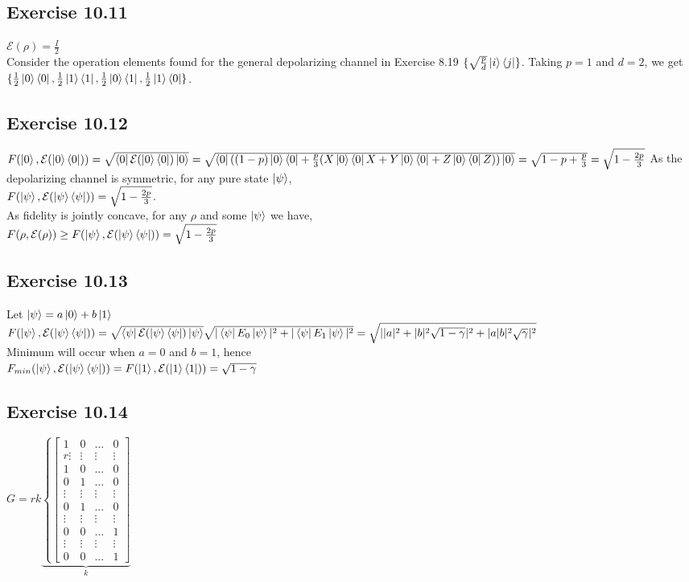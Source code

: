\documentclass[a4paper,12pt]{article}
\begin{document}
\subsection*{Exercise 10.11}
$\mathcal{E}(\rho)=\frac{I}{2}$\\
Consider the operation elements found for the general depolarizing channel in Exercise
8.19 $\{\sqrt{\frac{p}{d}}\ket{i}\bra{j}\}$. Taking $p=1$ and $d=2$, we get 
$\{\frac{1}{2}\ket{0}\bra{0},\frac{1}{2}\ket{1}\bra{1},\frac{1}{2}\ket{0}\bra{1},\frac{1}{2}\ket{1}\bra{0}\}$.
\subsection*{Exercise 10.12}
$F(\ket{0},\mathcal{E}(\ket{0}\bra{0}))=\sqrt{\bra{0}\mathcal{E}(\ket{0}\bra{0})\ket{0}}\\
=\sqrt{\bra{0}((1-p)\ket{0}\bra{0}+\frac{p}{3}(X\ket{0}\bra{0}X+Y\ket{0}\bra{0}+Z\ket{0}\bra{0}Z))\ket{0}}=
\sqrt{1-p+\frac{p}{3}}=\sqrt{1-\frac{2p}{3}}$
As the depolarizing channel is symmetric, for any pure state $\ket{\psi}$,\\ 
$F(\ket{\psi},\mathcal{E}(\ket{\psi}\bra{\psi}))=\sqrt{1-\frac{2p}{3}}$. \\As fidelity is
jointly concave, for any $\rho$ and some $\ket{\psi}$ we have,\\
$F(\rho, \mathcal{E}(\rho))\geq F(\ket{\psi},\mathcal{E}(\ket{\psi}\bra{\psi}))=\sqrt{1-\frac{2p}{3}}$
\subsection*{Exercise 10.13}
Let $\ket{\psi}=a\ket{0}+b\ket{1}$\\
$F(\ket{\psi},\mathcal{E}(\ket{\psi}\bra{\psi}))=\sqrt{\bra{\psi}\mathcal{E}(\ket{\psi}\bra{\psi})\ket{\psi}}
\\
\sqrt{|\bra{\psi}E_0\ket{\psi}|^2+|\bra{\psi}E_1\ket{\psi}|^2}=
\sqrt{||a|^2+|b|^2\sqrt{1-\gamma}|^2+|a|b|^2\sqrt{\gamma}|^2}$\\
Minimum will occur when $a=0$ and $b=1$, hence\\
$F_{min}(\ket{\psi},\mathcal{E}(\ket{\psi}\bra{\psi}))=F(\ket{1},\mathcal{E}(\ket{1}\bra{1}))=\sqrt{1-\gamma}$
\subsection*{Exercise 10.14}
$G=
rk\underbrace{\left\{
\begin{bmatrix}
    1 & 0 & \ldots & 0\\
    \scriptstyle{r}\vdots & \vdots & \vdots & \vdots\\
    1 & 0 & \ldots & 0\\
    0 & 1 & \ldots & 0\\
    \vdots & \vdots & \vdots & \vdots\\
    0 & 1 & \ldots & 0\\
    \vdots & \vdots & \vdots & \vdots\\
    0 & 0 & \ldots & 1\\
    \vdots & \vdots & \vdots & \vdots\\
    0 & 0 & \ldots & 1
    
\end{bmatrix}\right.}_{k}$
\newpage
\end{document}
